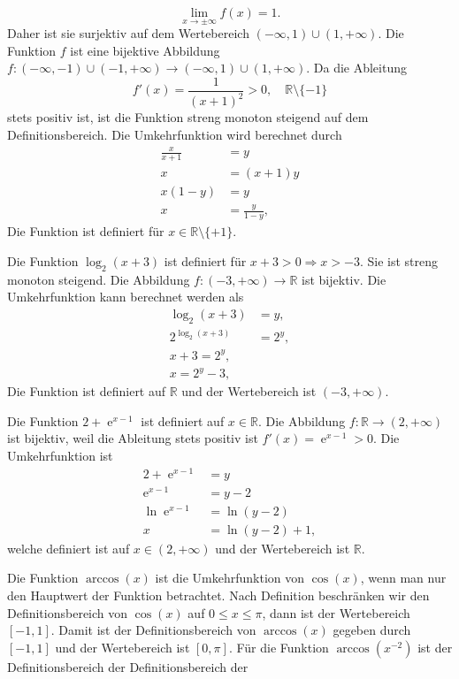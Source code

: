 {\begin{iii}
$$\lim_{x\to\pm\infty} f(x)=1.$$
Daher ist sie surjektiv auf dem Wertebereich $(-\infty,1) \cup (1, +\infty)$. Die Funktion $f$ ist eine bijektive Abbildung
$f: (-\infty,-1) \cup (-1, +\infty)\to(-\infty,1) \cup (1, +\infty)$. Da die Ableitung $$f'(x)=\frac{1}{(x+1)^2} > 0, \quad \mathbb R \setminus \{-1\}$$
stets positiv ist, ist die Funktion streng monoton steigend auf dem Definitionsbereich.
Die Umkehrfunktion wird berechnet durch
\begin{align*}
\frac{x}{x+1} &= y\\
x & = (x+1)y\\
x(1-y) & = y\\
x &= \frac{y}{1-y},
\end{align*}
Die Funktion ist definiert f\"ur $x \in \mathbb R \setminus \{+1\}$.
\item Die Funktion $\log_2(x+3)$ ist definiert f\"ur $x+3 > 0 \Rightarrow x > -3$. Sie ist streng monoton steigend. Die Abbildung $f: (-3, +\infty) \to \mathbb R$ 
ist bijektiv.
Die Umkehrfunktion kann berechnet werden als
\begin{align*}
\log_2(x+3) &= y,\\
2^{\log_2(x+3)} & = 2^y,\\
x+3 = 2^y,\\
x = 2^y-3,
\end{align*}
Die Funktion ist definiert auf $\mathbb R$ und der Wertebereich ist $(-3, +\infty)$.
\item Die Funktion $2+\operatorname{e}^{x-1}$ ist definiert auf $x\in \mathbb R$. Die Abbildung $f: \mathbb R \to (2, +\infty)$ ist bijektiv,
weil die Ableitung stets positiv ist $f'(x) = \operatorname{e}^{x-1} > 0$.
%
Die Umkehrfunktion ist
\begin{align*}
2+\operatorname{e}^{x-1} &= y\\
\operatorname{e}^{x-1} & = y-2\\
\ln{\operatorname{e}^{x-1}}& = \ln{(y-2)}\\
x & = \ln{(y-2)}+1,
\end{align*}
welche definiert ist auf $x\in (2, +\infty)$ und der Wertebereich ist $\mathbb R$.
\item Die Funktion $\arccos(x)$ ist die Umkehrfunktion von $\cos(x)$, wenn man nur den Hauptwert der Funktion betrachtet. Nach Definition beschr\"anken wir den 
Definitionsbereich von $\cos(x)$ auf $0 \leq x \leq \pi$, dann ist der Wertebereich $[-1,1]$. Damit ist der Definitionsbereich von $\arccos(x)$ gegeben 
durch $[-1,1]$ und der Wertebereich ist $[0,\pi]$. F\"ur die Funktion $\arccos(x^{-2})$ ist der Definitionsbereich der Definitionsbereich der 

\end{iii}}
